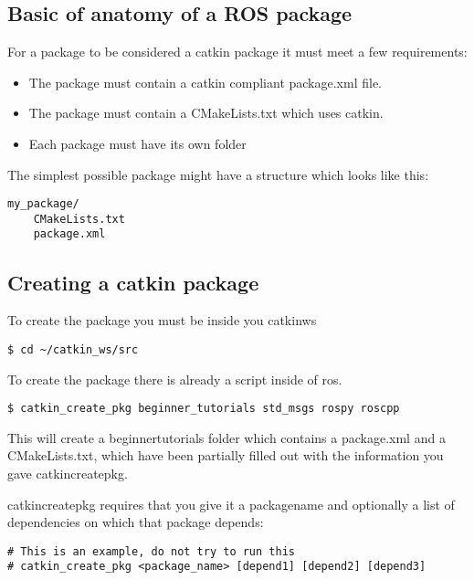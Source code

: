 \subsection{Basic of anatomy of a ROS package}
For a package to be considered a catkin package it must meet a few requirements:
\begin{itemize}
	\item The package must contain a catkin compliant package.xml file.
	\item The package must contain a CMakeLists.txt which uses catkin.
	\item Each package must have its own folder
\end{itemize}

\noindent The simplest possible package might have a structure which looks like this:

\begin{lstlisting}[breaklines=true languages=bash]
my_package/
	CMakeLists.txt
	package.xml
\end{lstlisting}

\subsection{Creating a catkin package}

To create the package you must be inside you catkin\textunderscore ws
\begin{lstlisting}[breaklines=true languages=bash]
$ cd ~/catkin_ws/src
\end{lstlisting}

\noindent To create the package there is already a script inside of ros.

\begin{lstlisting}[breaklines=true languages=bash]
$ catkin_create_pkg beginner_tutorials std_msgs rospy roscpp
\end{lstlisting}

\noindent This will create a beginner\textunderscore tutorials folder which contains a package.xml and a CMakeLists.txt, which have been partially filled out with the information you gave catkin\textunderscore create\textunderscore pkg.
\newline

\noindent catkin\textunderscore create\textunderscore pkg requires that you give it a package\textunderscore name and optionally a list of dependencies on which that package depends:

\begin{lstlisting}[breaklines=true languages=bash]
# This is an example, do not try to run this
# catkin_create_pkg <package_name> [depend1] [depend2] [depend3]
\end{lstlisting}
\newpage
\pagebreak

